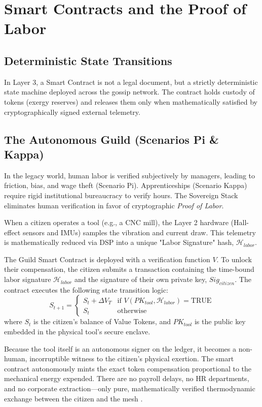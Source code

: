 \chapter{Smart Contracts and the Proof of Labor}

\section{Deterministic State Transitions}
In Layer 3, a Smart Contract is not a legal document, but a strictly deterministic state machine deployed across the gossip network. The contract holds custody of tokens (exergy reserves) and releases them only when mathematically satisfied by cryptographically signed external telemetry.

\section{The Autonomous Guild (Scenarios Pi \& Kappa)}
In the legacy world, human labor is verified subjectively by managers, leading to friction, bias, and wage theft (Scenario Pi). Apprenticeships (Scenario Kappa) require rigid institutional bureaucracy to verify hours. The Sovereign Stack eliminates human verification in favor of cryptographic \textit{Proof of Labor}.

When a citizen operates a tool (e.g., a CNC mill), the Layer 2 hardware (Hall-effect sensors and IMUs) samples the vibration and current draw. This telemetry is mathematically reduced via DSP into a unique "Labor Signature" hash, $\mathcal{H}_{labor}$. 

The Guild Smart Contract is deployed with a verification function $V$. To unlock their compensation, the citizen submits a transaction containing the time-bound labor signature $\mathcal{H}_{labor}$ and the signature of their own private key, $Sig_{citizen}$. The contract executes the following state transition logic:
\begin{equation}
S_{t+1} = 
\begin{cases} 
S_t + \Delta V_T & \text{if } V(PK_{tool}, \mathcal{H}_{labor}) = \text{TRUE} \\
S_t & \text{otherwise}
\end{cases}
\end{equation}
where $S_t$ is the citizen's balance of Value Tokens, and $PK_{tool}$ is the public key embedded in the physical tool's secure enclave.

Because the tool itself is an autonomous signer on the ledger, it becomes a non-human, incorruptible witness to the citizen's physical exertion. The smart contract autonomously mints the exact token compensation proportional to the mechanical energy expended. There are no payroll delays, no HR departments, and no corporate extraction—only pure, mathematically verified thermodynamic exchange between the citizen and the mesh \cite{wood2014ethereum}.

